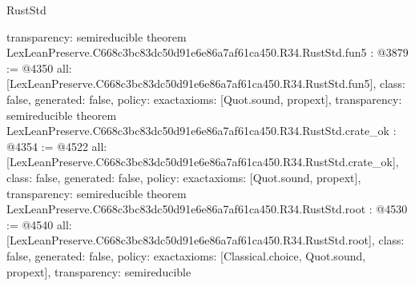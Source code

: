 \begin{lexlean}{RustStd}
\begin{coremodule}
{  transparency: semireducible
}
theorem LexLeanPreserve.C668c3bc83dc50d91e6e86a7af61ca450.R34.RustStd.fun5 : @3879 := @4350 {
  all: [LexLeanPreserve.C668c3bc83dc50d91e6e86a7af61ca450.R34.RustStd.fun5],
  class: false,
  generated: false,
  policy: exact{axioms: [Quot.sound, propext]},
  transparency: semireducible
}
theorem LexLeanPreserve.C668c3bc83dc50d91e6e86a7af61ca450.R34.RustStd.crate_ok : @4354 := @4522 {
  all: [LexLeanPreserve.C668c3bc83dc50d91e6e86a7af61ca450.R34.RustStd.crate_ok],
  class: false,
  generated: false,
  policy: exact{axioms: [Quot.sound, propext]},
  transparency: semireducible
}
theorem LexLeanPreserve.C668c3bc83dc50d91e6e86a7af61ca450.R34.RustStd.root : @4530 := @4540 {
  all: [LexLeanPreserve.C668c3bc83dc50d91e6e86a7af61ca450.R34.RustStd.root],
  class: false,
  generated: false,
  policy: exact{axioms: [Classical.choice, Quot.sound, propext]},
  transparency: semireducible
}


\end{coremodule}
\end{lexlean}
